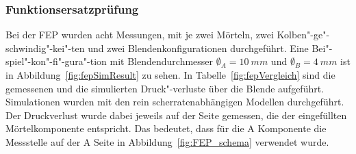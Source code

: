 \subsubsection{Funktionsersatzprüfung}
Bei der FEP wurden acht Messungen, mit je zwei Mörteln, zwei Kolben"-ge"-schwindig"-kei"-ten und zwei Blendenkonfigurationen durchgeführt. 
Eine Bei"-spiel"-kon"-fi"-gura"-tion mit Blendendurchmesser $\emptyset_A=\SI{10}{mm}$ und $\emptyset_B=\SI{4}{mm}$ ist in Abbildung~\ref{fig:fepSimResult} zu sehen.
In Tabelle~\ref{fig:fepVergleich} sind die gemessenen und die simulierten Druck"-verluste über die Blende aufgeführt. Simulationen wurden mit den rein scherratenabhängigen Modellen durchgeführt. 
Der Druckverlust wurde dabei jeweils auf der Seite gemessen, die der eingefüllten Mörtelkomponente entspricht.
Das bedeutet, dass für die A Komponente die Messstelle auf der A Seite in Abbildung~\ref{fig:FEP_schema} verwendet wurde.
%
